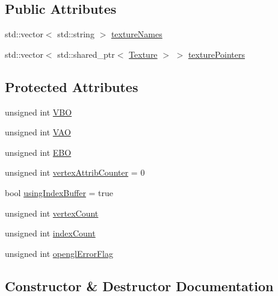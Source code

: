 \subsection*{Public Attributes}
\begin{DoxyCompactItemize}
\item 
std\+::vector$<$ std\+::string $>$ \mbox{\hyperlink{classpiolot_1_1_mesh_a846f32a4e5b9426db5fdc76a6828b195}{texture\+Names}}
\item 
std\+::vector$<$ std\+::shared\+\_\+ptr$<$ \mbox{\hyperlink{classpiolot_1_1_texture}{Texture}} $>$ $>$ \mbox{\hyperlink{classpiolot_1_1_mesh_a266423d1215e337db045baa99ca6ad88}{texture\+Pointers}}
\end{DoxyCompactItemize}
\subsection*{Protected Attributes}
\begin{DoxyCompactItemize}
\item 
unsigned int \mbox{\hyperlink{classpiolot_1_1_mesh_a937bc2daa3a4b8e7d751ce7dbd65cb43}{V\+BO}}
\item 
unsigned int \mbox{\hyperlink{classpiolot_1_1_mesh_a6ad4c6fbd31933aa4803650f918ab277}{V\+AO}}
\item 
unsigned int \mbox{\hyperlink{classpiolot_1_1_mesh_a523f048f2a1ec6bdbe3179d1b1822647}{E\+BO}}
\item 
unsigned int \mbox{\hyperlink{classpiolot_1_1_mesh_a641fac9e111d3eed8992e7a616d6f9bc}{vertex\+Attrib\+Counter}} = 0
\item 
bool \mbox{\hyperlink{classpiolot_1_1_mesh_a490f057b9ff145fd162d31839bfda5e0}{using\+Index\+Buffer}} = true
\item 
unsigned int \mbox{\hyperlink{classpiolot_1_1_mesh_a7db2c12891c5df244ab243ce75f68c02}{vertex\+Count}}
\item 
unsigned int \mbox{\hyperlink{classpiolot_1_1_mesh_a4483ae9ec80da17e7bc4277d032112ab}{index\+Count}}
\item 
unsigned int \mbox{\hyperlink{classpiolot_1_1_mesh_a8d286f1e153dfcbd2883b347c9a4f162}{opengl\+Error\+Flag}}
\end{DoxyCompactItemize}


\subsection{Constructor \& Destructor Documentation}
\mbox{\label{classpiolot_1_1_mesh_a74d2647106f2fab38f95eb0ab5c678ef}} 
